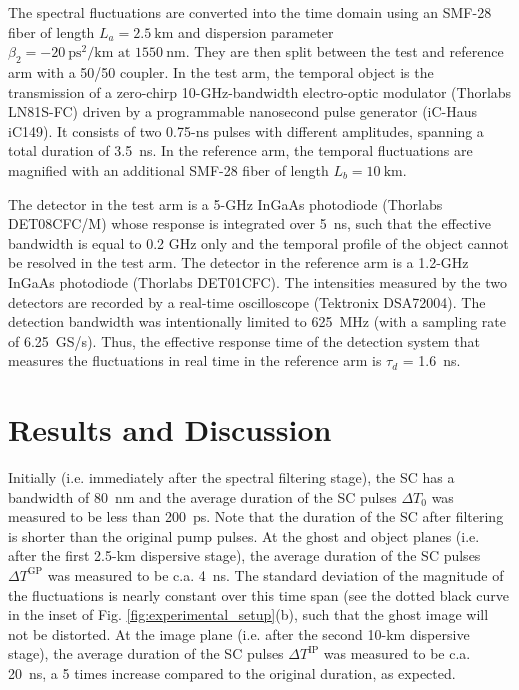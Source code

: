 \documentclass[aip,graphicx]{revtex4-1}
\begin{document}
The spectral fluctuations are converted into the time domain using an SMF-28 fiber of length $L_a = 2.5 ~\text{km}$ and dispersion parameter $\beta_2 = -20~ \text{ps}^2\text{/km at } 1550 ~\text{nm}$. They are then split between the test and reference arm with a 50/50 coupler. In the test arm, the temporal object is the transmission of a zero-chirp 10-GHz-bandwidth electro-optic modulator (Thorlabs \mbox{LN81S-FC}) driven by a programmable nanosecond pulse generator (iC-Haus iC149). It consists of two {0.75-ns} pulses with different amplitudes, spanning a total duration of {3.5~ns}. In the reference arm, the temporal fluctuations are magnified with an additional SMF-28 fiber of length $L_b=10~\text{km}$.

The detector in the test arm is a 5-GHz InGaAs photodiode (Thorlabs DET08CFC/M) whose response is integrated over 5~ns, such that the effective bandwidth is equal to 0.2 GHz only and the temporal profile of the object cannot be resolved in the test arm. The detector in the reference arm is a 1.2-GHz InGaAs photodiode (Thorlabs DET01CFC). The intensities measured by the two detectors are recorded by a real-time oscilloscope (Tektronix DSA72004). The detection bandwidth was intentionally limited to 625~MHz (with a sampling rate of 6.25~GS/s). Thus, the effective response time of the detection system that measures the fluctuations in real time in the reference arm is $\tau_d$ = 1.6~ns.

\section{Results and Discussion}
Initially (i.e. immediately after the spectral filtering stage), the SC has a bandwidth of 80~nm and the average duration of the SC pulses $\Delta T_0$  was measured to be less than 200~ps. Note that the duration of the SC after filtering is shorter than the original pump pulses. 
At the ghost and object planes (i.e. after the first {2.5-km} dispersive stage), the average duration of the SC pulses $\Delta T^{\text{GP}}$ was measured to be c.a. 4~ns. The standard deviation of the magnitude of the fluctuations is nearly constant over this time span (see the dotted black curve in the inset of Fig.  \ref{fig:experimental_setup}(b), such that the ghost image will not be distorted. 
At the image plane (i.e. after the second 10-km dispersive stage), the average duration of the SC pulses $\Delta T^{\text{IP}}$  was measured to be c.a. 20~ns, a 5 times increase compared to the original duration, as expected.
\end{document}

